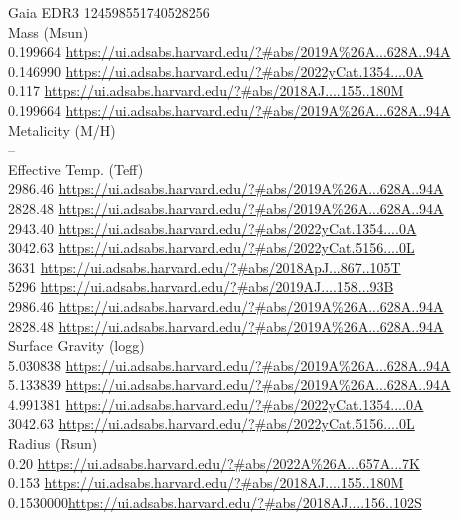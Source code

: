 Gaia EDR3 124598551740528256\\
Mass (Msun)\\
0.199664 \url{https://ui.adsabs.harvard.edu/?#abs/2019A%26A...628A..94A}\\
0.146990 \url{https://ui.adsabs.harvard.edu/?#abs/2022yCat.1354....0A}\\
0.117 \url{https://ui.adsabs.harvard.edu/?#abs/2018AJ....155..180M}\\
0.199664 \url{https://ui.adsabs.harvard.edu/?#abs/2019A%26A...628A..94A}\\
Metalicity (M/H)\\
--\\
Effective Temp. (Teff)\\
2986.46 \url{https://ui.adsabs.harvard.edu/?#abs/2019A%26A...628A..94A}\\
2828.48 \url{https://ui.adsabs.harvard.edu/?#abs/2019A%26A...628A..94A}\\
2943.40 \url{https://ui.adsabs.harvard.edu/?#abs/2022yCat.1354....0A}\\
3042.63 \url{https://ui.adsabs.harvard.edu/?#abs/2022yCat.5156....0L}\\
3631 \url{https://ui.adsabs.harvard.edu/?#abs/2018ApJ...867..105T}\\
5296 \url{https://ui.adsabs.harvard.edu/?#abs/2019AJ....158...93B}\\
2986.46 \url{https://ui.adsabs.harvard.edu/?#abs/2019A%26A...628A..94A}\\
2828.48	\url{https://ui.adsabs.harvard.edu/?#abs/2019A%26A...628A..94A}\\
Surface Gravity (logg)\\
5.030838 \url{https://ui.adsabs.harvard.edu/?#abs/2019A%26A...628A..94A}\\
5.133839 \url{https://ui.adsabs.harvard.edu/?#abs/2019A%26A...628A..94A}\\
4.991381 \url{https://ui.adsabs.harvard.edu/?#abs/2022yCat.1354....0A}\\
3042.63 \url{https://ui.adsabs.harvard.edu/?#abs/2022yCat.5156....0L}\\
Radius (Rsun)\\
0.20 \url{https://ui.adsabs.harvard.edu/?#abs/2022A%26A...657A...7K}\\
0.153 \url{https://ui.adsabs.harvard.edu/?#abs/2018AJ....155..180M}\\
0.1530000\url{https://ui.adsabs.harvard.edu/?#abs/2018AJ....156..102S}\\